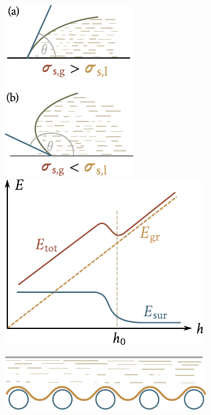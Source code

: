 \begin{figure}[!htb]
	\begin{minipage}[t]{0.5\linewidth}
		\begin{center}
			\includegraphics[scale=0.95]{figures/ch_14/fig_14_9.pdf}
			\caption[]{}
			\label{fig:14_9}
		\end{center}
	\end{minipage}
	\hspace{-0.05cm}
	\begin{minipage}[t]{0.5\linewidth}
		\begin{center}
			\includegraphics[scale=0.95]{figures/ch_14/fig_14_10.pdf}
			\caption[]{}
			\label{fig:14_10}
		\end{center}
	\end{minipage}
	\vspace{-0.3cm}
\end{figure}

\begin{figure}[t]
	\begin{center}
		\includegraphics[scale=0.95]{figures/ch_14/fig_14_11.pdf}
		\caption[]{}
		\label{fig:14_11}
	\end{center}
	\vspace{-0.9cm}
\end{figure}

